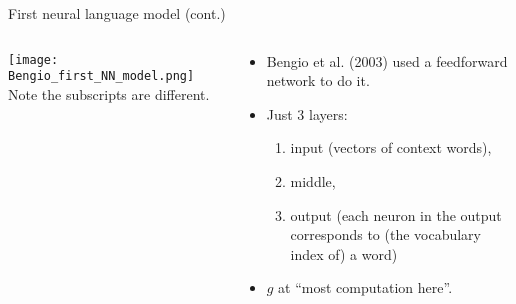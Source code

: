 \documentclass[11pt,handout]{beamer}
\begin{document}
\begin{frame}{First neural language model (cont.)}
\begin{columns}
   \begin{column}{.6\textwidth}
      \texttt{[image: Bengio\_first\_NN\_model.png]}  
 {     \tiny    Note the subscripts are different.  }
   \end{column}
   \begin{column}{.6\textwidth}
      \begin{itemize}
       \item Bengio et al. (2003) used a feedforward network to do it.
       \item Just 3 layers: 
       \begin{enumerate}
        \item input (vectors of context words), 
        \item middle, 
        \item output (each neuron in the output corresponds to (the vocabulary index of) a word)
       \end{enumerate}
       \item $g$ at ``most computation here''.
      \end{itemize}
   \end{column}
\end{columns}
\end{frame}

\end{document}
